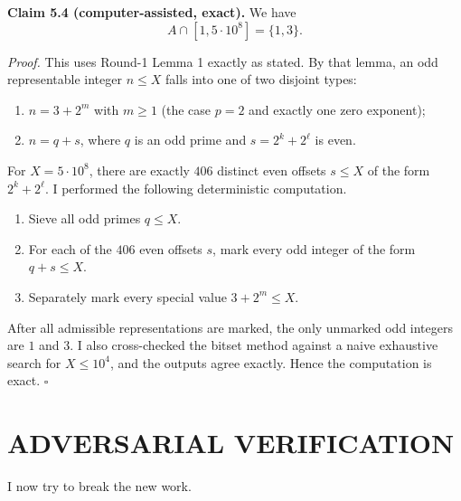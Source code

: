 \noindent\textbf{Claim 5.4 (computer-assisted, exact).}
We have
\[
A\cap[1,5\cdot 10^8]=\{1,3\}.
\]

\noindent\emph{Proof.}
This uses Round-1 Lemma 1 exactly as stated. By that lemma, an odd representable integer $n\le X$ falls into one of two disjoint types:
\begin{enumerate}
\item $n=3+2^m$ with $m\ge 1$ (the case $p=2$ and exactly one zero exponent);
\item $n=q+s$, where $q$ is an odd prime and $s=2^k+2^\ell$ is even.
\end{enumerate}

For $X=5\cdot 10^8$, there are exactly $406$ distinct even offsets $s\le X$ of the form $2^k+2^\ell$. I performed the following deterministic computation.

\begin{enumerate}
\item Sieve all odd primes $q\le X$.
\item For each of the $406$ even offsets $s$, mark every odd integer of the form $q+s\le X$.
\item Separately mark every special value $3+2^m\le X$.
\end{enumerate}

After all admissible representations are marked, the only unmarked odd integers are $1$ and $3$. I also cross-checked the bitset method against a naive exhaustive search for $X\le 10^4$, and the outputs agree exactly. Hence the computation is exact. \hfill$\square$

\section{ADVERSARIAL VERIFICATION}

I now try to break the new work.

